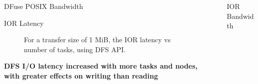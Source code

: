 \documentclass[final]{beamer}
\newlength{\sepwidth}
\newlength{\colwidth}
\newcommand{\separatorcolumn}{\begin{column}{\sepwidth}\end{column}}
\begin{document}
\begin{frame}[t, fragile]
\begin{columns}[t]
\begin{column}{\colwidth}
\begin{block}{DFuse POSIX Bandwidth}


    
  \end{block}


  \begin{block}{IOR Latency}
    \begin{figure} 
      \centering 
       
      \caption{For a transfer size of 1 MiB, the IOR latency vs number of tasks, using DFS API.}
    \label{fig:ior_latency}
    \end{figure}
    {{\normalsize{\textbf{DFS I/O latency increased with more tasks and nodes, with greater effects on writing than reading}}}}
  \end{block}
 

\end{column}

\separatorcolumn

\begin{column}{\colwidth}

  \begin{block}{IOR Bandwidth}


\end{block}
\end{column}
\end{columns}
\end{frame}
\end{document}
